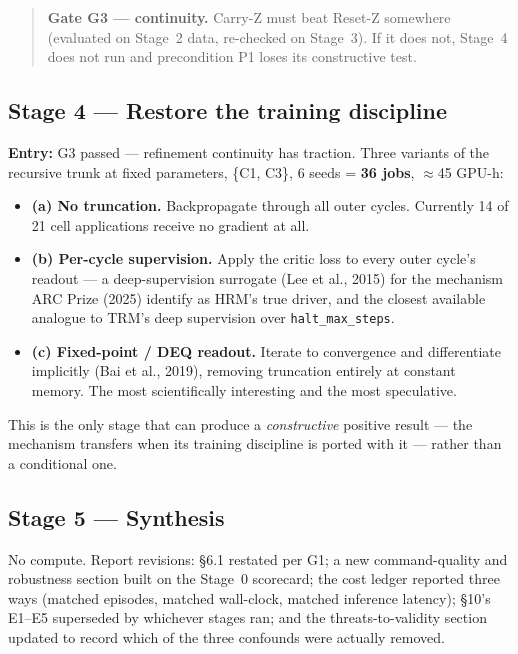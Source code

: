 \documentclass[11pt]{article}
\newcommand{\code}[1]{\texttt{\small #1}}
\newcommand{\gate}[1]{\textcolor{gateamber}{\textbf{#1}}}
\begin{document}
\begin{quote}
\gate{Gate G3 --- continuity.} Carry-Z must beat Reset-Z somewhere (evaluated on Stage~2 data, re-checked on Stage~3). If it does not, Stage~4 does not run and precondition P1 loses its constructive test.
\end{quote}

\subsection{Stage 4 --- Restore the training discipline}

\textbf{Entry:} G3 passed --- refinement continuity has traction. Three variants of the recursive trunk at fixed parameters, \{C1, C3\}, 6 seeds = \textbf{36 jobs}, $\approx$45 GPU-h:

\begin{itemize}[leftmargin=1.4em,itemsep=1pt]
\item \textbf{(a) No truncation.} Backpropagate through all outer cycles. Currently 14 of 21 cell applications receive no gradient at all.
\item \textbf{(b) Per-cycle supervision.} Apply the critic loss to every outer cycle's readout --- a deep-supervision surrogate (Lee et al., 2015) for the mechanism ARC Prize (2025) identify as HRM's true driver, and the closest available analogue to TRM's deep supervision over \code{halt\_max\_steps}.
\item \textbf{(c) Fixed-point / DEQ readout.} Iterate to convergence and differentiate implicitly (Bai et al., 2019), removing truncation entirely at constant memory. The most scientifically interesting and the most speculative.
\end{itemize}

This is the only stage that can produce a \emph{constructive} positive result --- the mechanism transfers when its training discipline is ported with it --- rather than a conditional one.

\subsection{Stage 5 --- Synthesis}

No compute. Report revisions: \S6.1 restated per G1; a new command-quality and robustness section built on the Stage~0 scorecard; the cost ledger reported three ways (matched episodes, matched wall-clock, matched inference latency); \S10's E1--E5 superseded by whichever stages ran; and the threats-to-validity section updated to record which of the three confounds were actually removed.
\end{document}
